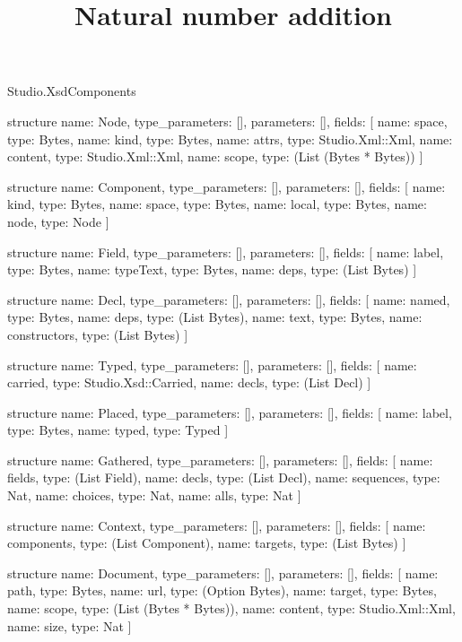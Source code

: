 \begin{lexlean}{Studio.XsdComponents}
\title{Natural number addition}
\begin{semanticmodule}
structure{
  name: Node,
  type_parameters: [],
  parameters: [],
  fields: [
    {name: space, type: Bytes},
    {name: kind, type: Bytes},
    {name: attrs, type: Studio.Xml::Xml},
    {name: content, type: Studio.Xml::Xml},
    {name: scope, type: (List (Bytes * Bytes))}
  ]
}

structure{
  name: Component,
  type_parameters: [],
  parameters: [],
  fields: [
    {name: kind, type: Bytes},
    {name: space, type: Bytes},
    {name: local, type: Bytes},
    {name: node, type: Node}
  ]
}

structure{
  name: Field,
  type_parameters: [],
  parameters: [],
  fields: [
    {name: label, type: Bytes},
    {name: typeText, type: Bytes},
    {name: deps, type: (List Bytes)}
  ]
}

structure{
  name: Decl,
  type_parameters: [],
  parameters: [],
  fields: [
    {name: named, type: Bytes},
    {name: deps, type: (List Bytes)},
    {name: text, type: Bytes},
    {name: constructors, type: (List Bytes)}
  ]
}

structure{
  name: Typed,
  type_parameters: [],
  parameters: [],
  fields: [
    {name: carried, type: Studio.Xsd::Carried},
    {name: decls, type: (List Decl)}
  ]
}

structure{
  name: Placed,
  type_parameters: [],
  parameters: [],
  fields: [
    {name: label, type: Bytes},
    {name: typed, type: Typed}
  ]
}

structure{
  name: Gathered,
  type_parameters: [],
  parameters: [],
  fields: [
    {name: fields, type: (List Field)},
    {name: decls, type: (List Decl)},
    {name: sequences, type: Nat},
    {name: choices, type: Nat},
    {name: alls, type: Nat}
  ]
}

structure{
  name: Context,
  type_parameters: [],
  parameters: [],
  fields: [
    {name: components, type: (List Component)},
    {name: targets, type: (List Bytes)}
  ]
}

structure{
  name: Document,
  type_parameters: [],
  parameters: [],
  fields: [
    {name: path, type: Bytes},
    {name: url, type: (Option Bytes)},
    {name: target, type: Bytes},
    {name: scope, type: (List (Bytes * Bytes))},
    {name: content, type: Studio.Xml::Xml},
    {name: size, type: Nat}
  ]
}


\end{semanticmodule}
\end{lexlean}
